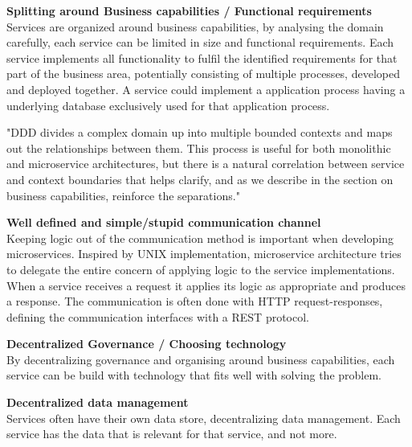\textbf{Splitting around Business capabilities / Functional requirements}\\
Services are organized around business capabilities, by analysing the domain carefully, each service can be limited in size and functional requirements. Each service implements all functionality to fulfil the identified requirements for that part of the business area, potentially consisting of multiple processes, developed and deployed together. A service could implement a application process having a underlying database exclusively used for that application process.

"DDD divides a complex domain up into multiple bounded contexts and maps out the relationships between them. This process is useful for both monolithic and microservice architectures, but there is a natural correlation between service and context boundaries that helps clarify, and as we describe in the section on business capabilities, reinforce the separations." \cite{fowler2014microservices}

\textbf{Well defined and simple/stupid communication channel}\\
Keeping logic out of the communication method is important when developing microservices. Inspired by UNIX implementation, microservice architecture tries to delegate the entire concern of applying logic to the service implementations. When a service receives a request it applies its logic as appropriate and produces a response. The communication is often done with HTTP request-responses, defining the communication interfaces with a REST protocol.

\textbf{Decentralized Governance / Choosing technology}\\
By decentralizing governance and organising around business capabilities, each service can be build with technology that fits well with solving the problem.

\textbf{Decentralized data management}\\
Services often have their own data store, decentralizing data management. Each service has the data that is relevant for that service, and not more. 


